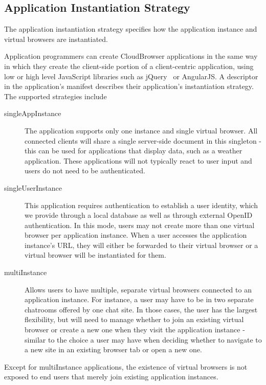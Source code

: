 \subsection{Application Instantiation Strategy}
\label{sec:appinstantiation}

The application instantiation strategy specifies
how the application instance and virtual browsers are instantiated.

Application programmers can create CloudBrowser applications in the same way in which
they create the client-side portion of a client-centric application, using low or high level
JavaScript libraries such as jQuery~\cite{jquery} or AngularJS.  
A descriptor in the application's manifest describes 
their application's instantiation strategy.
The supported strategies include

\begin{description}

\item[singleAppInstance] The application supports only one instance and single virtual browser.
    All connected clients will share a single server-side document in this singleton - this can be
    used for applications that display data, such as a weather application. These applications will not
    typically react to user input and users do not need to be authenticated.

\item[singleUserInstance]  This application requires authentication to establish a
    user identity, which we provide through a local database as well as through external OpenID
    authentication.   In this mode, users may not create more than one virtual browser per
    application instance.  When a user accesses the application instance's URL, they will either
    be forwarded to their virtual browser or a virtual browser will be instantiated for them.

\item[multiInstance]
    Allows users to have multiple, separate virtual browsers connected to an application
    instance. For instance, a user may have to be in two separate chatrooms offered by one chat site.
    In those cases, the user has the largest flexibility, but will need to manage whether
    to join an existing virtual browser or create a new one when they visit the application instance
    - similar to the choice a user may have when deciding whether to navigate to a new site in
    an existing browser tab or open a new one.

\end{description}

Except for multiInstance applications, the existence of virtual browsers is not exposed to
end users that merely join existing application instances.




